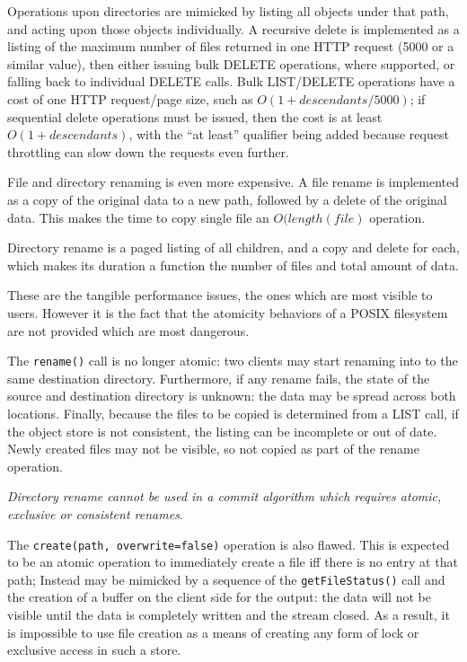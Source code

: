 \documentclass[conference]{IEEEtran}
\begin{document}
Operations upon directories are mimicked by listing all objects under that path,
and acting upon those objects individually.
A recursive delete is implemented as a listing of the maximum number of files
returned in one HTTP request (5000 or a similar value), then either issuing
bulk DELETE operations, where supported, or falling back to individual DELETE
calls.
Bulk LIST/DELETE operations have a cost of one HTTP request/page size, such
as $O(1 + descendants/5000)$; if sequential delete operations must be issued, then
the cost is at least $O(1+ descendants)$, with the ``at least'' qualifier being
added because request throttling can slow down the requests even further.

File and directory renaming is even more expensive.
A file rename is implemented as a copy of the original data to a new path,
followed by a delete of the original data.
This makes the time to copy single file an $O(length(file)$ operation.

Directory rename is a paged listing of all children, and a copy and delete for
each, which makes its duration a function the number of files and total amount of data.

These are the tangible performance issues, the ones which are most visible
to users.
However it is the fact that the atomicity behaviors of a POSIX filesystem
are not provided which are most dangerous.

The \texttt{rename()} call is no longer atomic: two clients may start renaming
into to the same destination directory.
Furthermore, if any rename fails, the state of the source and destination
directory is unknown: the data may be spread across both locations.
Finally, because the files to be copied is determined from a LIST call,
if the object store is not consistent, the listing can be incomplete or out of
date.
Newly created files may not be visible, so not copied as part of the rename
operation.

\emph{Directory rename cannot be used in a commit algorithm which
requires atomic, exclusive or consistent renames}.

The \texttt{create(path, overwrite=false)} operation is also flawed.
This is expected to be an atomic operation to immediately create a file iff there is
no entry at that path;
Instead may be mimicked by a sequence of the \texttt{getFileStatus()} call
and the creation of a buffer on the client side for the output: the data
will not be visible until the data is completely written and the stream
closed.
As a result, it is impossible to use file creation as a means of creating any
form of lock or exclusive access in such a store.
\end{document}
